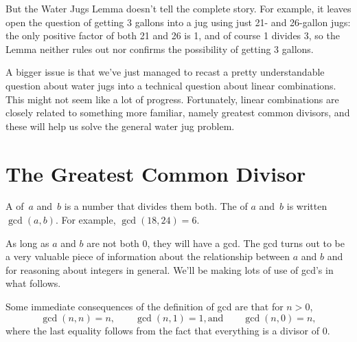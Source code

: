 But the Water Jugs Lemma doesn't tell the complete story.  For
example, it leaves open the question of getting 3 gallons into a jug
using just 21- and 26-gallon jugs: the only positive factor of both 21
and 26 is 1, and of course 1 divides 3, so the Lemma neither rules out
nor confirms the possibility of getting 3 gallons.

A bigger issue is that we've just managed to recast a pretty
understandable question about water jugs into a technical question
about linear combinations.  This might not seem like a lot of
progress.  Fortunately, linear combinations are closely related to
something more familiar, namely greatest common divisors, and these
will help us solve the general water jug problem.

\begin{problems}
\practiceproblems
{}

\classproblems
{}

\end{problems}

\section{The Greatest Common Divisor}\label{sec:gcd}

A  of~$a$ and~$b$ is a number that divides them
both.  The  of $a$ and~$b$ is written
 $\gcd(a, b)$.  For example, $\gcd(18, 24) = 6$.

As long as $a$ and $b$ are not both 0, they will have a gcd. The gcd
turns out to be a very valuable piece of information about the
relationship between $a$ and $b$ and for reasoning about integers in
general.  We'll be making lots of use of gcd's in what follows.

Some immediate consequences of the definition of gcd are that for $n > 0$,
\[
\gcd(n, n) = n, \qquad \gcd(n, 1) = 1, \text{and} \qquad  \gcd(n,0) = n,
\]
where the last equality follows from the fact that everything is a
divisor of 0.

